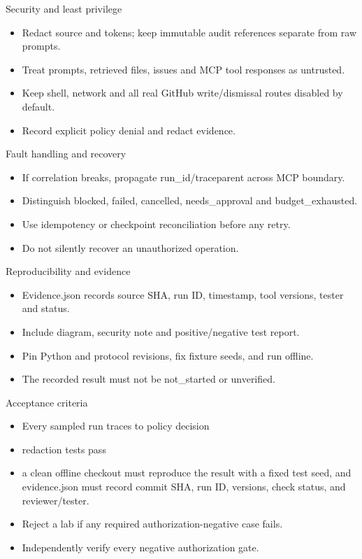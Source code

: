 \documentclass[aspectratio=169,10pt]{beamer}
\begin{document}
\begin{frame}{Security and least privilege}
\small
\begin{itemize}
\item Redact source and tokens; keep immutable audit references separate from raw prompts.
\item Treat prompts, retrieved files, issues and MCP tool responses as untrusted.
\item Keep shell, network and all real GitHub write/dismissal routes disabled by default.
\item Record explicit policy denial and redact evidence.
\end{itemize}

\end{frame}

\begin{frame}{Fault handling and recovery}
\small
\begin{itemize}
\item If correlation breaks, propagate run\_id/traceparent across MCP boundary.
\item Distinguish blocked, failed, cancelled, needs\_approval and budget\_exhausted.
\item Use idempotency or checkpoint reconciliation before any retry.
\item Do not silently recover an unauthorized operation.
\end{itemize}

\end{frame}

\begin{frame}{Reproducibility and evidence}
\small
\begin{itemize}
\item Evidence.json records source SHA, run ID, timestamp, tool versions, tester and status.
\item Include diagram, security note and positive/negative test report.
\item Pin Python and protocol revisions, fix fixture seeds, and run offline.
\item The recorded result must not be not\_started or unverified.
\end{itemize}

\end{frame}

\begin{frame}{Acceptance criteria}
\small
\begin{itemize}
\item Every sampled run traces to policy decision
\item redaction tests pass
\item a clean offline checkout must reproduce the result with a fixed test seed, and evidence.json must record commit SHA, run ID, versions, check status, and reviewer/tester.
\item Reject a lab if any required authorization-negative case fails.
\item Independently verify every negative authorization gate.
\end{itemize}

\end{frame}
\end{document}
